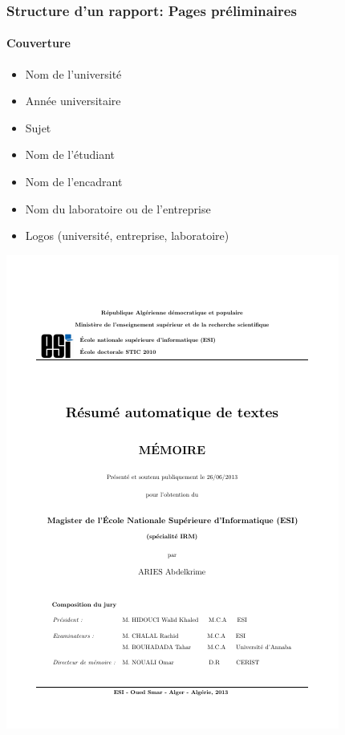 \documentclass[xcolor=table]{beamer}
\begin{document}
\begin{frame}
\frametitle{Structure d'un rapport: Pages préliminaires}
\framesubtitle{Couverture}

\begin{minipage}{0.60\textwidth}
	\begin{itemize}
		\item Nom de l'université 
		\item Année universitaire
		\item Sujet
		\item Nom de l'étudiant
		\item Nom de l'encadrant 
		\item Nom du laboratoire ou de l'entreprise
		\item Logos (université, entreprise, laboratoire)
	\end{itemize}
\end{minipage}
\begin{minipage}{0.38\textwidth}
	\includegraphics[width=\textwidth,frame]{..//img/Bweb03-redaction/couverture.png}
\end{minipage}

\end{frame}
\end{document}
